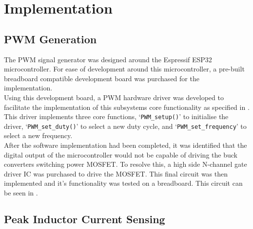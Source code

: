 \chapter{Implementation}\label{C:implementation}


\section{PWM Generation}\label{S:pwm_gen_impl}

The PWM signal generator was designed around the Espressif ESP32 microcontroller. For ease of development around this microcontroller, a pre-built breadboard compatible development board was purchased for the implementation. \\

Using this development board, a PWM hardware driver was developed to facilitate the implementation of this subsystems core functionality as specified in . This driver implements three core functions, `\lstinline{PWM_setup()}' to initialise the driver, `\lstinline{PWM_set_duty()}' to select a new duty cycle, and `\lstinline{PWM_set_frequency}' to select a new frequency.\\

After the software implementation had been completed, it was identified that the digital output of the microcontroller would not be capable of driving the buck converters switching power MOSFET. To resolve this, a high side N-channel gate driver IC was purchased to drive the MOSFET. This final circuit was then implemented and it's functionality was tested on a breadboard. This circuit can be seen in .



\section{Peak Inductor Current Sensing}\label{S:current_sense_impl}



